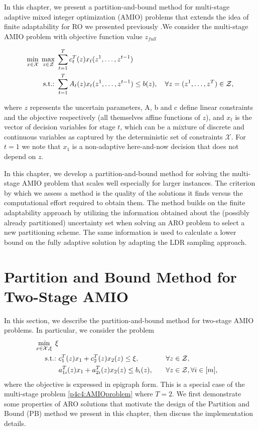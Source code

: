 
In this chapter, we present a partition-and-bound method for multi-stage adaptive mixed integer optimization (AMIO) problems that extends the idea of finite adaptability for RO we presented previously .We consider the multi-stage AMIO problem with objective function value $z_{full}$

\begin{align}\label{p4c4:AMIOproblem}
\min_{x\in\mathcal{X}}\;\max_{z\in\mathcal{Z}}\; & \sum_{t=1}^T c_t^T(z) x_t (z^1,\dots ,z^{t-1})\\
\mathop{\text{s.t.:~}} & \sum_{t=1}^T A_t(z)x_t(z^1,\dots , z^{t-1}) \leq b(z),\quad\forall z = (z^1,\dots ,z^T)\in\mathcal{Z},
\end{align}

where $z$ represents the uncertain parameters, A, b and c define linear constraints and the objective respectively (all themselves affine functions of $z$), and $x_t$ is the vector of decision variables for stage $t$, which can be a mixture of discrete and continuous variables as captured by the deterministic set of constraints $\mathcal{X}$. For $t = 1$ we note that $x_1$ is a non-adaptive here-and-now decision that does not depend on $z$.

In this chapter, we develop a partition-and-bound method for solving the multi-stage AMIO problem that scales well especially for larger instances. The criterion by which we assess a method is the quality of the solutions it finds versus the computational effort required to obtain them. The method builds on the finite adaptability approach by utilizing the information obtained about the (possibly already partitioned) uncertainty set when solving an ARO problem to select a new partitioning scheme. The same information is used to calculate a lower bound on the fully adaptive solution by adapting the LDR sampling approach.

\section{Partition and Bound Method for Two-Stage AMIO}

In this section, we describe the partition-and-bound method for two-stage AMIO problems. In particular, we consider the problem 
\begin{align}\label{p4c4:2stageproblem}
\min_{x\in\mathcal{X},\xi}\;\xi \\
\mathop{\text{s.t.:~}} & c_1^T ( z) x_1 + c_2^T(z) x_2 ( z) \leq \xi, \quad &&\forall z\in\mathcal{Z}, \\
	& a_{1i}^T(z)x_1 + a_{2i}^T(z) x_2(z) \leq b_i(z),\quad&&\forall z\in\mathcal{Z}, \forall i\in [m],
\end{align}
where the objective is expressed in epigraph form. This is a special case of the multi-stage problem \eqref{p4c4:AMIOproblem} where $T=2$. We first demonstrate some properties of ARO solutions that motivate the design of the Partition and Bound (PB) method we present in this chapter, then discuss the implementation details.\\

